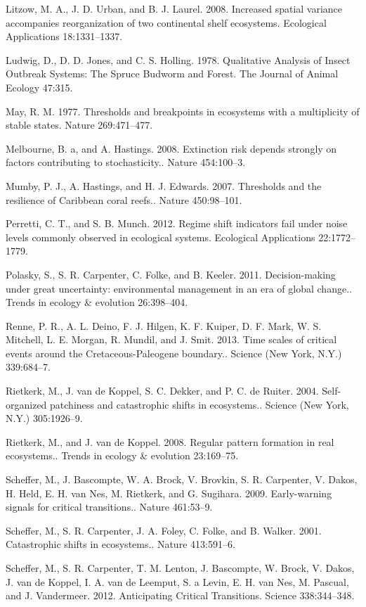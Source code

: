 \documentclass{article}
\begin{document}
Litzow, M. A., J. D. Urban, and B. J. Laurel. 2008. Increased spatial
variance accompanies reorganization of two continental shelf ecosystems.
Ecological Applications 18:1331--1337.

Ludwig, D., D. D. Jones, and C. S. Holling. 1978. Qualitative Analysis
of Insect Outbreak Systems: The Spruce Budworm and Forest. The Journal
of Animal Ecology 47:315.

May, R. M. 1977. Thresholds and breakpoints in ecosystems with a
multiplicity of stable states. Nature 269:471--477.

Melbourne, B. a, and A. Hastings. 2008. Extinction risk depends strongly
on factors contributing to stochasticity.. Nature 454:100--3.

Mumby, P. J., A. Hastings, and H. J. Edwards. 2007. Thresholds and the
resilience of Caribbean coral reefs.. Nature 450:98--101.

Perretti, C. T., and S. B. Munch. 2012. Regime shift indicators fail
under noise levels commonly observed in ecological systems. Ecological
Applications 22:1772--1779.

Polasky, S., S. R. Carpenter, C. Folke, and B. Keeler. 2011.
Decision-making under great uncertainty: environmental management in an
era of global change.. Trends in ecology \& evolution 26:398--404.

Renne, P. R., A. L. Deino, F. J. Hilgen, K. F. Kuiper, D. F. Mark, W. S.
Mitchell, L. E. Morgan, R. Mundil, and J. Smit. 2013. Time scales of
critical events around the Cretaceous-Paleogene boundary.. Science (New
York, N.Y.) 339:684--7.

Rietkerk, M., J. van de Koppel, S. C. Dekker, and P. C. de Ruiter. 2004.
Self-organized patchiness and catastrophic shifts in ecosystems..
Science (New York, N.Y.) 305:1926--9.

Rietkerk, M., and J. van de Koppel. 2008. Regular pattern formation in
real ecosystems.. Trends in ecology \& evolution 23:169--75.

Scheffer, M., J. Bascompte, W. A. Brock, V. Brovkin, S. R. Carpenter, V.
Dakos, H. Held, E. H. van Nes, M. Rietkerk, and G. Sugihara. 2009.
Early-warning signals for critical transitions.. Nature 461:53--9.

Scheffer, M., S. R. Carpenter, J. A. Foley, C. Folke, and B. Walker.
2001. Catastrophic shifts in ecosystems.. Nature 413:591--6.

Scheffer, M., S. R. Carpenter, T. M. Lenton, J. Bascompte, W. Brock, V.
Dakos, J. van de Koppel, I. A. van de Leemput, S. a Levin, E. H. van
Nes, M. Pascual, and J. Vandermeer. 2012. Anticipating Critical
Transitions. Science 338:344--348.
\end{document}
